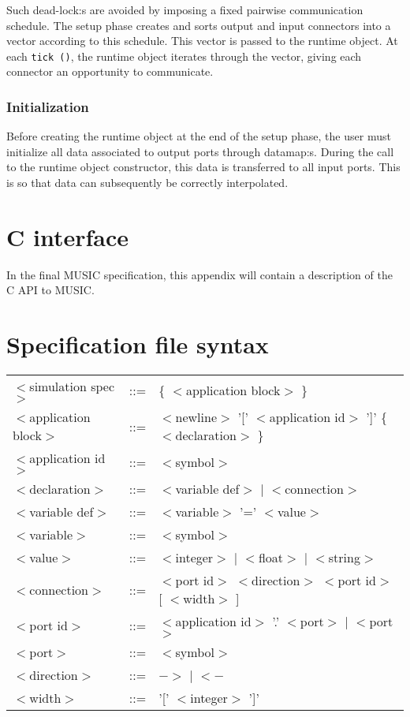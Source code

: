 \documentclass[a4paper]{report}
\begin{document}
\begin{metatext}
Such dead-lock:s are avoided by imposing a fixed pairwise
communication schedule.  The setup phase creates and sorts output and
input connectors into a vector according to this schedule.  This
vector is passed to the runtime object.  At each \lstinline|tick ()|, the
runtime object iterates through the vector, giving each connector an
opportunity to communicate.

\subsection{Initialization}

Before creating the runtime object at the end of the setup phase, the
user must initialize all data associated to output ports through
datamap:s.  During the call to the runtime object constructor, this
data is transferred to all input ports.  This is so that data can
subsequently be correctly interpolated.
\end{metatext}

\appendix

\chapter{C interface}

In the final MUSIC specification, this appendix will contain a
description of the C API to MUSIC.


\chapter{Specification file syntax}
\label{sec:specsyntax}

\newcommand{\nt}[1]{$<$#1$>$}

\begin{tabular}{lcl}
\nt{simulation spec}   & ::= & \{ \nt{application block} \} \\
\nt{application block} & ::= & \nt{newline} '[' \nt{application id} ']' \{ \nt{declaration}
\} \\
\nt{application id}    & ::= & \nt{symbol} \\
\nt{declaration}       & ::= & \nt{variable def} $|$ \nt{connection} \\
\nt{variable def}      & ::= & \nt{variable} '=' \nt{value} \\
\nt{variable}	       & ::= & \nt{symbol} \\
\nt{value} 	       & ::= & \nt{integer} $|$ \nt{float} $|$ \nt{string} \\
\nt{connection}	       & ::= & \nt{port id} \nt{direction} \nt{port id} [ \nt{width} ] \\
\nt{port id}	       & ::= & \nt{application id} '.' \nt{port} $|$
\nt{port} \\
\nt{port}	       & ::= & \nt{symbol} \\
\nt{direction}	       & ::= & $->$ $|$ $<-$ \\
\nt{width}	       & ::= & '[' \nt{integer} ']' \\
\end{tabular}

\printindex
\end{document}
